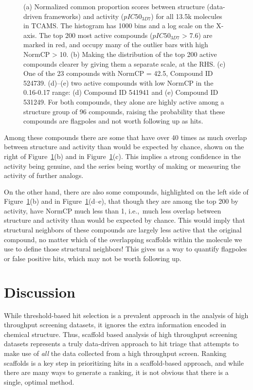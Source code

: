 \documentclass[journal=jacsat,biochem,manuscript=article]{achemso}
\newcommand*\fref[1]{Figure~\ref{fig:#1}}
\newcommand*\ie{i.e.,~}
\begin{document}
\begin{figure}
  \caption{(a) Normalized common proportion scores between structure (data-driven frameworks) and activity ($pIC50_{3D7}$) for all 13.5k molecules in TCAMS.  The histogram has 1000 bins and a log scale on the X-axis. The top 200 most active compounds ($pIC50_{3D7}$ > 7.6) are marked in red, and occupy many of the outlier bars with high NormCP > 10. (b) Making the distribution of the top 200 active compounds clearer by giving them a separate scale, at the RHS. (c) One of the 23 compounds with NormCP = 42.5, Compound ID 524739. (d)--(e) two active compounds with low NormCP in the 0.16-0.17 range: (d) Compound ID 541941 and (e) Compound ID 531249. For both compounds, they alone are highly active among a structure group of 96 compounds, raising the probability that these compounds are flagpoles and not worth following up as hits.}
\label{fig:NormCP}   
\end{figure}

Among these compounds there are some that have over 40 times as much overlap between structure and activity than would be expected by chance, shown on the right of \fref{NormCP}(b) and in \fref{NormCP}(c).  This implies a strong confidence in the activity being genuine, and the series being worthy of making or measuring the activity of further analogs.

On the other hand, there are also some compounds, highlighted on the left side of \fref{NormCP}(b) and in \fref{NormCP}(d--e), that though they are among the top 200 by activity, have NormCP much less than 1, \ie much less overlap between structure and activity than would be expected by chance.  This would imply that structural neighbors of these compounds are largely less active that the original compound, no matter which of the overlapping scaffolds within the molecule we use to define those structural neighbors!  This gives us a way to quantify flagpoles or false positive hits, which may not be worth following up.

\section{Discussion}
\label{sec:discussion}

While threshold-based hit selection is a prevalent approach in the
analysis of high throughput screening datasets, it
ignores the extra information encoded in chemical structure. Thus,
scaffold based analysis of high throughput screening datasets
represents a truly data-driven approach to hit triage that attempts to
make use of \emph{all} the data collected from a high throughput
screen. Ranking scaffolds is a key step in prioritizing hits in a
scaffold-based approach, and while there are many ways to generate a
ranking, it is not obvious that there is a single, optimal method.
\end{document}
